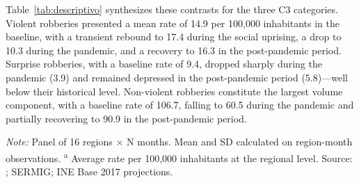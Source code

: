 \documentclass[pdflatex,sn-basic]{sn-jnl}
\newcommand{\tablenote}[1]{%
  \vspace{2pt}%
  {\par\footnotesize\textit{Note:} #1\par}%
}
\begin{document}
Table~\ref{tab:descriptivo} synthesizes these contrasts for the three C3 categories. Violent robberies presented a mean rate of 14.9 per 100,000 inhabitants in the baseline, with a transient rebound to 17.4 during the social uprising, a drop to 10.3 during the pandemic, and a recovery to 16.3 in the post-pandemic period. Surprise robberies, with a baseline rate of 9.4, dropped sharply during the pandemic (3.9) and remained depressed in the post-pandemic period (5.8)---well below their historical level. Non-violent robberies constitute the largest volume component, with a baseline rate of 106.7, falling to 60.5 during the pandemic and partially recovering to 90.9 in the post-pandemic period.

\begin{table}[htbp]
\centering
\caption{Descriptive statistics by period and C3 category (regional panel)}
\label{tab:descriptivo}
\footnotesize
{}
\tablenote{Panel of 16 regions $\times$ N months. Mean and SD calculated on region-month observations. \textsuperscript{a} Average rate per 100,000 inhabitants at the regional level. Source: \citet{INE2026}; SERMIG; INE Base 2017 projections.}
\end{table}
\end{document}
